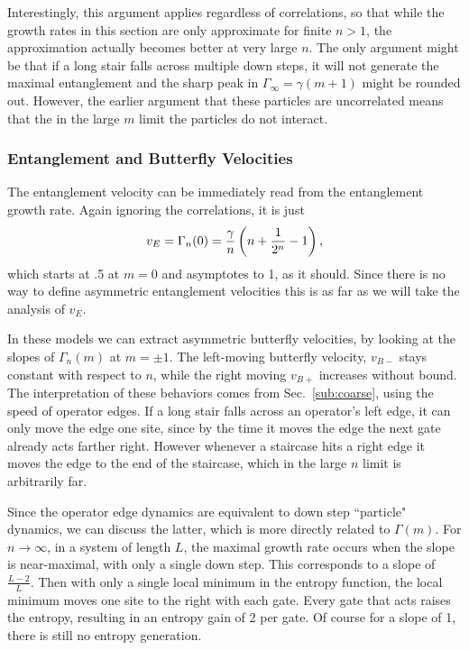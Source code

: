 Interestingly, this argument applies regardless of correlations, so that while the growth rates in this section are only approximate for finite $n>1$, the approximation actually becomes better at very large $n$. The only argument might be that if a long stair falls across multiple down steps, it will not generate the maximal entanglement and the sharp peak in $\Gamma_\infty = \gamma(m+1)$ might be rounded out. However, the earlier argument that these particles are uncorrelated means that the in the large $m$ limit the particles do not interact.

\subsubsection{Entanglement and Butterfly Velocities} \label{susub:vels}

The entanglement velocity can be immediately read from the entanglement growth rate. Again ignoring the correlations, it is just 
\begin{align}
v_E=\Gamma_n(0)=\frac{\gamma}{n}\left(n+\frac{1}{2^n}-1\right),
\end{align}
which starts at .5 at $m=0$ and asymptotes to 1, as it should. Since there is no way to define asymmetric entanglement velocities this is as far as we will take the analysis of $v_E$.

In these models we can extract asymmetric butterfly velocities, by looking at the slopes of $\Gamma_n(m)$ at $m=\pm 1$. The left-moving butterfly velocity, $v_{B-}$ stays constant with respect to $n$, while the right moving $v_{B+}$ increases without bound. The interpretation of these behaviors comes from Sec.~\ref{sub:coarse}, using the speed of operator edges. If a long stair falls across an operator's left edge, it can only move the edge one site, since by the time it moves the edge the next gate already acts farther right. However whenever a staircase hits a right edge it moves the edge to the end of the staircase, which in the large $n$ limit is arbitrarily far.

Since the operator edge dynamics are equivalent to down step ``particle" dynamics, we can discuss the latter, which is more directly related to $\Gamma(m)$.
For $n\to\infty$, in a system of length $L$, the maximal growth rate occurs when the slope is near-maximal, with only a single down step. This corresponds to a slope of $\frac{L-2}{L}$. Then with only a single local minimum in the entropy function, the local minimum moves one site to the right with each gate. Every gate that acts raises the entropy, resulting in an entropy gain of 2 per gate. Of course for a slope of 1, there is still no entropy generation.

